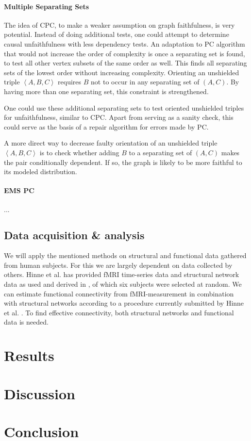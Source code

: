 \documentclass[a4paper, 10pt, english, twocolumn]{article}
\begin{document}
\paragraph{Multiple Separating Sets}
The idea of CPC, to make a weaker assumption on graph faithfulness, is very potential.
Instead of doing additional tests, one could attempt to determine causal unfaithfulness with less dependency tests.
An adaptation to PC algorithm that would not increase the order of complexity is once a separating set is found, to test all other vertex subsets of the same order as well.
This finds all separating sets of the lowest order without increasing complexity.
Orienting an unshielded triple $\left<A,B,C\right>$ requires $B$ not to occur in any separating set of $(A,C)$.
By having more than one separating set, this constraint is strengthened.

One could use these additional separating sets to test oriented unshielded triples for unfaithfulness, similar to CPC.
Apart from serving as a sanity check, this could serve as the basis of a repair algorithm for errors made by PC.

A more direct way to decrease faulty orientation of an unshielded triple $\left<A,B,C\right>$ is to check whether adding $B$ to a separating set of $(A,C)$ makes the pair conditionally dependent.
If so, the graph is likely to be more faithful to its modeled distribution.

\paragraph{EMS PC}
...

\subsection*{Data acquisition \& analysis}
We will apply the mentioned methods on structural and functional data gathered from human subjects.
For this we are largely dependent on data collected by others.
Hinne et al. has provided fMRI time-series data and structural network data as used and derived in \cite{hinne2013}, of which six subjects were selected at random.
We can estimate functional connectivity from fMRI-measurement in combination with structural 
networks according to a procedure currently submitted by Hinne et al. \cite{hinne2013submitted}.
To find effective connectivity, both structural networks and functional data is needed.


\section{Results}

\section{Discussion}

\section{Conclusion}

{}

\end{document}
